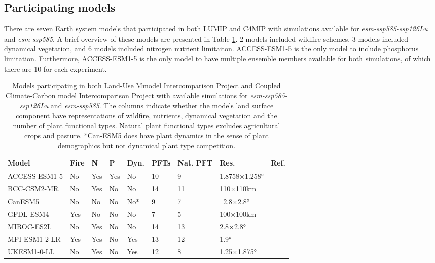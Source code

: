 \documentclass[]{article}
\begin{document}
\subsection{Participating models}

There are seven Earth system models that participated in both LUMIP and C4MIP with simulations available for \textit{esm-ssp585-ssp126Lu} and \textit{esm-ssp585}.
A brief overview of these models are presented in Table \ref{tab:models}.
2 models included wildfire schemes, 3 models included dynamical vegetation, and 6 models included nitrogen nutrient limitaiton.
ACCESS-ESM1-5 is the only model to include phosphorus limitation.
Furthermore, ACCESS-ESM1-5 is the only model to have multiple ensemble members available for both simulations, of which there are 10 for each experiment.

\begin{table}[H]
    \centering
    \begin{tabular}{lllllllll}
        \hline
Model         & Fire & N   & P   & Dyn. & PFTs & Nat. PFT & Res. & Ref.                                         \\ \hline
ACCESS-ESM1-5 & No   & Yes & Yes & No    & 10       & 9       & 1.8758×1.258°   & \cite{ziehn_australian_2020}   \\
BCC-CSM2-MR   & No   & Yes & No  & No    & 14       & 11      & 110×110km       & \cite{li_development_2019}     \\
CanESM5       & No   & No  & No  & No*   & 9        & 7       & ~2.8×2.8°       & \cite{swart_canadian_2019}     \\
GFDL-ESM4     & Yes  & No  & No  & No    & 7        & 5       & 100×100km       & \cite{dunne_gfdl_2020}         \\
MIROC-ES2L    & No   & Yes & No  & No    & 14       & 13      & 2.8×2.8°        & \cite{hajima_development_2020} \\
MPI-ESM1-2-LR & Yes  & Yes & No  & Yes   & 13       & 12      & 1.9°            & \cite{giorgetta_climate_2013}  \\
UKESM1-0-LL   & No   & Yes & No  & Yes   & 12       & 8       & 1.25×1.875°     & \cite{sellar_ukesm1_2019}      \\ \hline
    \end{tabular}
    \caption{Models participating in both Land-Use Mmodel Intercomparison Project and Coupled Climate-Carbon model Intercomparison Project with available simulations for \textit{esm-ssp585-ssp126Lu} and \textit{esm-ssp585}. The columns indicate whether the models land surface component have representations of wildfire, nutrients, dynamical vegetation and the number of plant functional types. Natural plant functional types excludes agricultural crops and pasture. *Can-ESM5 does have plant dynamics in the sense of plant demographics but not dynamical plant type competition.}
    \label{tab:models}
\end{table}
\end{document}
